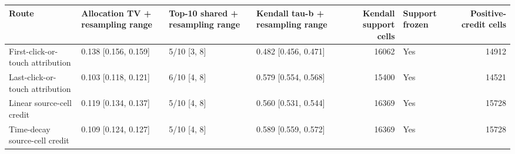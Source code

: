 \begin{tabular}{llllrlr}
\toprule
Route & Allocation TV + resampling range & Top-10 shared + resampling range & Kendall tau-b + resampling range & Kendall support cells & Support frozen & Positive-credit cells \\
\midrule
First-click-or-touch attribution & 0.138 [0.156, 0.159] & 5/10 [3, 8] & 0.482 [0.456, 0.471] & 16062 & Yes & 14912 \\
Last-click-or-touch attribution & 0.103 [0.118, 0.121] & 6/10 [4, 8] & 0.579 [0.554, 0.568] & 15400 & Yes & 14521 \\
Linear source-cell credit & 0.119 [0.134, 0.137] & 5/10 [4, 8] & 0.560 [0.531, 0.544] & 16369 & Yes & 15728 \\
Time-decay source-cell credit & 0.109 [0.124, 0.127] & 5/10 [4, 8] & 0.589 [0.559, 0.572] & 16369 & Yes & 15728 \\
\bottomrule
\end{tabular}

